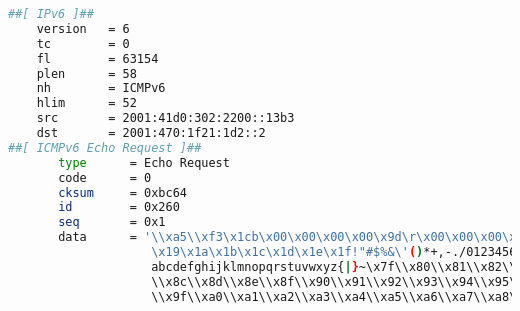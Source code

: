 \documentclass[onecolumn,12pt]{book}
\newcounter{c}
\begin{document}
\begin{lstlisting}[language=bash, basicstyle=\ttfamily\tiny, showstringspaces=false]
##[ IPv6 ]##
    version   = 6
    tc        = 0
    fl        = 63154
    plen      = 58
    nh        = ICMPv6
    hlim      = 52
    src       = 2001:41d0:302:2200::13b3
    dst       = 2001:470:1f21:1d2::2
##[ ICMPv6 Echo Request ]##
       type      = Echo Request
       code      = 0
       cksum     = 0xbc64
       id        = 0x260
       seq       = 0x1
       data      = '\\xa5\\xf3\x1cb\x00\x00\x00\x00\x9d\r\x00\x00\x00\x00\x00\x10\x1 1\x12\x13\x14\x15\x16\x17\x18
                    \x19\x1a\x1b\x1c\x1d\x1e\x1f!"#$%&\'()*+,-./0123456789:;<=>?@ABCDEFGHIJKLMNOPQRSTUVWXYZ[\\]^_`
                    abcdefghijklmnopqrstuvwxyz{|}~\x7f\\x80\\x81\\x82\\x83\\x84\\x85\\x86\\x87\\x88\\x89\\x8a\\x8b
                    \\x8c\\x8d\\x8e\\x8f\\x90\\x91\\x92\\x93\\x94\\x95\\x96\\x97\\x98\\x99\\x9a\\x9b\\x9c\\x9d\\x9e
                    \\x9f\\xa0\\xa1\\xa2\\xa3\\xa4\\xa5\\xa6\\xa7\\xa8\\xa9\\xaa\\xab\\xac\\xad\\xae\\xaf\\xb0\\xb1

\end{lstlisting}
\end{document}
